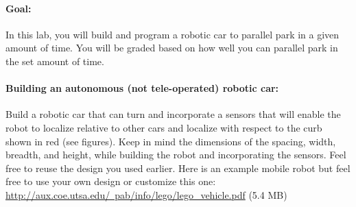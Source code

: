 \documentclass[11pt]{article}
\def\bluehref#1#2{\href{#1}{\color{blue} #2}}
\begin{document}
\paragraph{Goal:}
In this lab, you will build and program a robotic car to parallel park in a given amount of time. You will be graded based on how well you can parallel park in the set amount of time.

%
\paragraph{Building an autonomous (not tele-operated) robotic car:} Build a robotic car that can turn and incorporate a  sensors that will enable the robot to localize relative to other cars and localize with respect to the curb shown in red (see figures). Keep in mind the dimensions of the spacing, width, breadth, and height, while building the robot and incorporating the sensors. Feel free to reuse the design you used earlier. Here is an example mobile robot but feel free to use your own design or customize this one: \\ \bluehref{http://aux.coe.utsa.edu/~pab/info/lego/lego\_vehicle.pdf}{http://aux.coe.utsa.edu/~pab/info/lego/lego\_vehicle.pdf} (5.4 MB)

 
\vspace{0.1cm}
\end{document}

